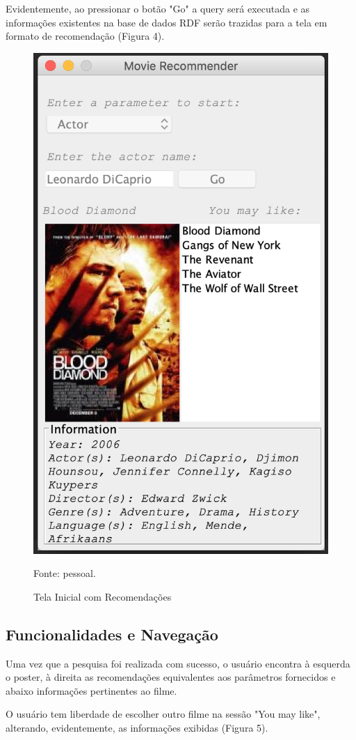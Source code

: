  Evidentemente, ao pressionar o botão "Go" a query será executada e as informações existentes na base de dados RDF serão trazidas para a tela em formato de recomendação (Figura 4).
 
   \begin{figure}[H]
 	\centering
 	\includegraphics[width=0.5\linewidth]{images/telaInicialRecomendacao}
 	\caption{Tela Inicial com Recomendações}
 	Fonte: pessoal.
 	\label{fig:Tela Inicial com Recomendações}
 \end{figure}


\subsection{Funcionalidades e Navegação} 
 
 Uma vez que a pesquisa foi realizada com sucesso, o usuário encontra à esquerda o poster, à direita as recomendações equivalentes aos parâmetros fornecidos e abaixo informações pertinentes ao filme.
 
 O usuário tem liberdade de escolher outro filme na sessão "You may like", alterando, evidentemente, as informações exibidas (Figura 5).
 
